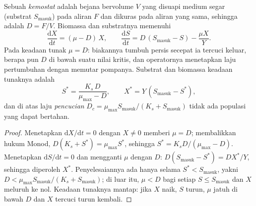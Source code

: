 \begin{theorem}[Kemostat]\label{thm:b2:microbial-metabolism:chemostat}
Sebuah \emph{kemostat} adalah bejana bervolume $V$ yang disuapi medium
segar (substrat $S_{\text{masuk}}$) pada aliran $F$ dan dikuras pada
aliran yang sama, sehingga \emph{} adalah $D = F/V$.
Biomassa dan substratnya memenuhi
\[
\frac{\mathrm{d}X}{\mathrm{d}t} = (\mu - D)\,X, \qquad
\frac{\mathrm{d}S}{\mathrm{d}t} = D\,(S_{\text{masuk}} - S) - \frac{\mu X}{Y}.
\]
Pada keadaan tunak $\mu = D$: biakannya tumbuh persis secepat ia
tercuci keluar, berapa pun $D$ di bawah suatu nilai kritis, dan
operatornya menetapkan laju pertumbuhan dengan memutar pompanya.
Substrat dan biomassa keadaan tunaknya adalah
\[
S^* = \frac{K_s\,D}{\mu_{\max} - D}, \qquad X^* = Y\,(S_{\text{masuk}} - S^*),
\]
dan di atas laju \emph{pencucian} $D_c = \mu_{\max}
S_{\text{masuk}}/(K_s + S_{\text{masuk}})$ tidak ada populasi yang dapat bertahan.
\end{theorem}
\begin{proof}
Menetapkan $\mathrm{d}X/\mathrm{d}t = 0$ dengan $X \neq 0$ memberi $\mu = D$;
membalikkan hukum Monod, $D(K_s + S^*) = \mu_{\max} S^*$, sehingga $S^* =
K_s D/(\mu_{\max} - D)$. Menetapkan $\mathrm{d}S/\mathrm{d}t = 0$ dan
mengganti $\mu$ dengan $D$: $D(S_{\text{masuk}} - S^*) = DX^*/Y$, sehingga
diperoleh $X^*$. Penyelesaiannya ada hanya selama $S^* < S_{\text{masuk}}$, yakni
$D < \mu_{\max} S_{\text{masuk}}/(K_s + S_{\text{masuk}})$; di luar itu,
$\mu < D$ bagi setiap $S \le S_{\text{masuk}}$ dan $X$ meluruh ke nol.
Keadaan tunaknya mantap: jika $X$ naik, $S$ turun, $\mu$ jatuh di bawah
$D$ dan $X$ tercuci turun kembali.
\end{proof}

